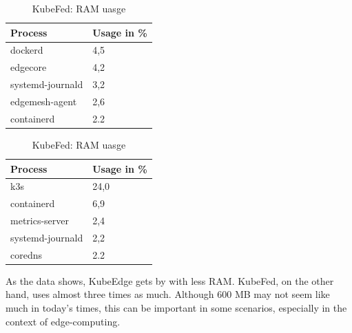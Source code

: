 \documentclass[MSC,Master,english]{twbook}%
\begin{document}
\begin{table}[ht]
    \begin{center}
        \begin{minipage}{.49\linewidth}
            \begin{center}
                \begin{tabular}{|l|l|}
                    \hline
                    Process & Usage in \%  \\
                    \hline
                    dockerd & 4,5 \\
                    edgecore & 4,2 \\
                    systemd-journald & 3,2 \\
                    edgemesh-agent & 2,6 \\
                    containerd & 2.2 \\
                    \hline
                \end{tabular}
                \caption{KubeEdge: RAM uasge}
                \label{tab:ke-ram-noload}
            \end{center}
        \end{minipage}
        \begin{minipage}{.49\linewidth}
            \begin{center}
                \begin{tabular}{|l|l|}
                    \hline
                    Process & Usage in \%  \\
                    \hline
                    k3s & 24,0 \\
                    containerd & 6,9 \\
                    metrics-server & 2,4 \\
                    systemd-journald & 2,2 \\
                    coredns & 2.2 \\
                    \hline
                \end{tabular}
                \caption{KubeFed: RAM uasge}
                \label{tab:kf-ram-noload}
            \end{center}
        \end{minipage}
    \end{center}
\end{table}
As the data shows, KubeEdge gets by with less RAM. KubeFed, on the other hand, uses almost three times as much. Although 600 MB may not seem like much in today's times, this can be important in some scenarios, especially in the context of edge-computing.
\end{document}
